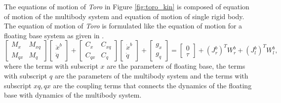The equations of motion of \emph{Toro} in Figure \ref{fig:toro_kin} is composed of equation of motion of the multibody system and equation of motion of single rigid body. The equation of motion of \emph{Toro} is formulated like the equation of motion for a floating base system as given in \cite{ott09}.
\begin{equation} \label{eq:dyn_biped}
\begin{bmatrix}
M_x &M_{xq} \\ M_{qx} &M_q
\end{bmatrix}
\begin{bmatrix}
\ddot{x}^b \\ \ddot{q}
\end{bmatrix}
+
\begin{bmatrix}
C_x &C_{xq} \\ C_{qx} &C_q
\end{bmatrix}
\begin{bmatrix}
\dot{x}^b \\ \dot{q}
\end{bmatrix}
+
\begin{bmatrix}
g_x \\ g_q
\end{bmatrix}
=
\begin{bmatrix}
0 \\ \tau
\end{bmatrix}
+ (J_r^b)^T W_r^b + (J_l^b)^T W_l^b,
\end{equation}
where the terms with subscript $x$ are the parameters of floating  base, the terms with subscript $q$ are the parameters of the multibody system and the terms with subscript $xq, qx$ are the coupling terms that connects the dynamics of the floating base with dynamics of the multibody system.

